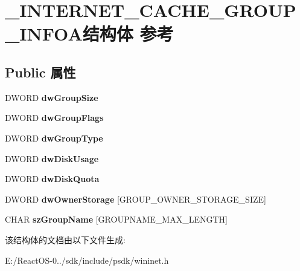 \hypertarget{struct___i_n_t_e_r_n_e_t___c_a_c_h_e___g_r_o_u_p___i_n_f_o_a}{}\section{\+\_\+\+I\+N\+T\+E\+R\+N\+E\+T\+\_\+\+C\+A\+C\+H\+E\+\_\+\+G\+R\+O\+U\+P\+\_\+\+I\+N\+F\+O\+A结构体 参考}
\label{struct___i_n_t_e_r_n_e_t___c_a_c_h_e___g_r_o_u_p___i_n_f_o_a}
\subsection*{Public 属性}
\begin{DoxyCompactItemize}
\item 
\mbox{\label{struct___i_n_t_e_r_n_e_t___c_a_c_h_e___g_r_o_u_p___i_n_f_o_a_ada33011fda6bf0e4849fc4edb2c24151}} 
D\+W\+O\+RD {\bfseries dw\+Group\+Size}
\item 
\mbox{\label{struct___i_n_t_e_r_n_e_t___c_a_c_h_e___g_r_o_u_p___i_n_f_o_a_a4a50c796971aa21d015c11f73724b487}} 
D\+W\+O\+RD {\bfseries dw\+Group\+Flags}
\item 
\mbox{\label{struct___i_n_t_e_r_n_e_t___c_a_c_h_e___g_r_o_u_p___i_n_f_o_a_a87ac27eb297659af058175461451ff79}} 
D\+W\+O\+RD {\bfseries dw\+Group\+Type}
\item 
\mbox{\label{struct___i_n_t_e_r_n_e_t___c_a_c_h_e___g_r_o_u_p___i_n_f_o_a_a2bf431b1cf2b4e2e4ec8578c78099c85}} 
D\+W\+O\+RD {\bfseries dw\+Disk\+Usage}
\item 
\mbox{\label{struct___i_n_t_e_r_n_e_t___c_a_c_h_e___g_r_o_u_p___i_n_f_o_a_aa68e0dd4a8a3811d903b1ff309c46e48}} 
D\+W\+O\+RD {\bfseries dw\+Disk\+Quota}
\item 
\mbox{\label{struct___i_n_t_e_r_n_e_t___c_a_c_h_e___g_r_o_u_p___i_n_f_o_a_ac591e57f545b088cbae33492e79dea50}} 
D\+W\+O\+RD {\bfseries dw\+Owner\+Storage} \mbox{[}G\+R\+O\+U\+P\+\_\+\+O\+W\+N\+E\+R\+\_\+\+S\+T\+O\+R\+A\+G\+E\+\_\+\+S\+I\+ZE\mbox{]}
\item 
\mbox{\label{struct___i_n_t_e_r_n_e_t___c_a_c_h_e___g_r_o_u_p___i_n_f_o_a_adecad6327f79a8755417eb6b23775524}} 
C\+H\+AR {\bfseries sz\+Group\+Name} \mbox{[}G\+R\+O\+U\+P\+N\+A\+M\+E\+\_\+\+M\+A\+X\+\_\+\+L\+E\+N\+G\+TH\mbox{]}
\end{DoxyCompactItemize}


该结构体的文档由以下文件生成\+:\begin{DoxyCompactItemize}
\item 
E\+:/\+React\+O\+S-\/0../sdk/include/psdk/wininet.\+h\end{DoxyCompactItemize}
